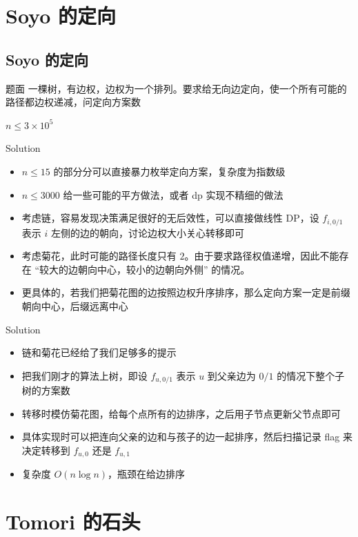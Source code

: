 ﻿\documentclass[aspectratio=169]{ctexbeamer}
\begin{document}
\section{Soyo 的定向}
\subsection{Soyo 的定向}
\begin{frame}{题面}
    一棵树，有边权，边权为一个排列。要求给无向边定向，使一个所有可能的路径都边权递减，问定向方案数

    $n\le 3\times 10^5$
\end{frame}

\begin{frame}{Solution}
    \begin{itemize}
        \item $n\le 15$ 的部分分可以直接暴力枚举定向方案，复杂度为指数级
        \item $n\le 3000$ 给一些可能的平方做法，或者 dp 实现不精细的做法
        \item 考虑链，容易发现决策满足很好的无后效性，可以直接做线性 DP，设 $f_{i,0/1}$ 表示 $i$ 左侧的边的朝向，讨论边权大小关心转移即可
        \item 考虑菊花，此时可能的路径长度只有 $ 2 $。由于要求路径权值递增，因此不能存在 “较大的边朝向中心，较小的边朝向外侧” 的情况。
        \item 更具体的，若我们把菊花图的边按照边权升序排序，那么定向方案一定是前缀朝向中心，后缀远离中心
    \end{itemize}
\end{frame}

\begin{frame}{Solution}
    \begin{itemize}
        \item 链和菊花已经给了我们足够多的提示
        \item 把我们刚才的算法上树，即设 $f_{u,0/1}$ 表示 $u$ 到父亲边为 $0/1$ 的情况下整个子树的方案数
        \item 转移时模仿菊花图，给每个点所有的边排序，之后用子节点更新父节点即可
        \item 具体实现时可以把连向父亲的边和与孩子的边一起排序，然后扫描记录 flag 来决定转移到 $f_{u,0}$ 还是 $f_{u,1}$
        \item 复杂度 $O(n\log n)$，瓶颈在给边排序
    \end{itemize}
\end{frame}


\section{Tomori 的石头}
\end{document}
